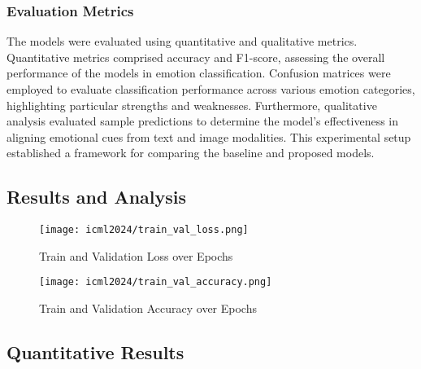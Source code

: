 \documentclass{article}
\theoremstyle{plain}
\theoremstyle{definition}
\theoremstyle{remark}
\begin{document}
\subsubsection{Evaluation Metrics}

The models were evaluated using quantitative and qualitative metrics. Quantitative metrics comprised accuracy and F1-score, assessing the overall performance of the models in emotion classification. Confusion matrices were employed to evaluate classification performance across various emotion categories, highlighting particular strengths and weaknesses. Furthermore, qualitative analysis evaluated sample predictions to determine the model's effectiveness in aligning emotional cues from text and image modalities. This experimental setup established a framework for comparing the baseline and proposed models.

\subsection{Results and Analysis}

\begin{figure}[ht]
\vskip 0.2in
\begin{center}
\centerline{\texttt{[image: icml2024/train\_val\_loss.png]}}
\caption{Train and Validation Loss over Epochs}
\label{figure:1}
\end{center}
\vskip -0.2in
\end{figure}

\begin{figure}[ht]
\vskip 0.2in
\begin{center}
\centerline{\texttt{[image: icml2024/train\_val\_accuracy.png]}}
\caption{Train and Validation Accuracy over Epochs}
\label{figure:2}
\end{center}
\vskip -0.2in
\end{figure}


\subsection{Quantitative Results}
\end{document}
